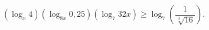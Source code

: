 \begin{ex}[type=inequality]
	\begin{condition}
		$(\log_x 4)(\log_{8x} 0,25)(\log_7 32x)\geqslant\log_7\left(\dfrac{1}{\sqrt[3]{16}}\right).$
	\end{condition}
	\answer{$ x \in\left(0;2^{-\sqrt{15}}\right]\cup\left(\dfrac{1}{8};1\right)\cup\left[2^{\sqrt{15}};+\infty\right).$}
\end{ex}